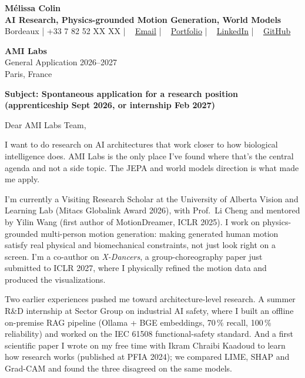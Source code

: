 \documentclass[10pt, letterpaper]{article}
\providecommand{\myphone}{+33 7 82 52 XX XX}
\begin{document}
\begin{center}
    {\fontsize{22}{22}\selectfont \textbf{\color{MyRed}Mélissa Colin}} \\[4pt]
    {\large \textbf{AI Research, Physics-grounded Motion Generation, World Models}} \\[4pt]
    \small{
    \faMapMarker* Bordeaux \quad|\quad
    \faPhone* \myphone{} \quad|\quad
    \faEnvelope~ \href{mailto:contact@melissacolin.ai}{Email} \quad|\quad
    \faGlobe~ \href{https://melissacolin.ai}{Portfolio} \quad|\quad
    \faLinkedin~ \href{https://www.linkedin.com/in/melissacolin/}{LinkedIn} \quad|\quad
    \faGithub~ \href{https://github.com/melissa-colin}{GitHub}
    }
\end{center}

\vspace{12pt}

\textbf{AMI Labs} \\
General Application 2026--2027 \\
Paris, France

\textbf{Subject: Spontaneous application for a research position (apprenticeship Sept 2026, or internship Feb 2027)}

Dear AMI Labs Team,

I want to do research on AI architectures that work closer to how biological intelligence does. AMI Labs is the only place I've found where that's the central agenda and not a side topic. The JEPA and world models direction is what made me apply.

I'm currently a Visiting Research Scholar at the University of Alberta Vision and Learning Lab (Mitacs Globalink Award 2026), with Prof.~Li Cheng and mentored by Yilin Wang (first author of MotionDreamer, ICLR 2025). I work on physics-grounded multi-person motion generation: making generated human motion satisfy real physical and biomechanical constraints, not just look right on a screen. I'm a co-author on \textit{X-Dancers}, a group-choreography paper just submitted to ICLR 2027, where I physically refined the motion data and produced the visualizations.

Two earlier experiences pushed me toward architecture-level research. A summer R\&D internship at Sector Group on industrial AI safety, where I built an offline on-premise RAG pipeline (Ollama + BGE embeddings, 70\,\% recall, 100\,\% reliability) and worked on the IEC 61508 functional-safety standard. And a first scientific paper I wrote on my free time with Ikram Chraibi Kaadoud to learn how research works (published at PFIA 2024); we compared LIME, SHAP and Grad-CAM and found the three disagreed on the same models.
\end{document}
